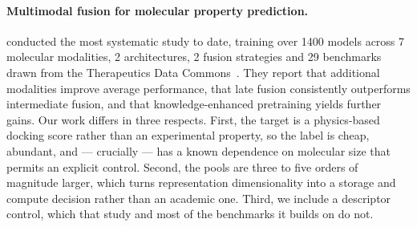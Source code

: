 \paragraph{Multimodal fusion for molecular property prediction.}
\citet{martinezgalindo2026multimodality} conducted the most systematic study to
date, training over \num{1400} models across \num{7} molecular modalities,
\num{2} architectures, \num{2} fusion strategies and \num{29} benchmarks drawn
from the Therapeutics Data Commons~\citep{huang2021tdc}. They report that
additional modalities improve average performance, that late fusion
consistently outperforms intermediate fusion, and that knowledge-enhanced
pretraining yields further gains. Our work differs in three respects. First,
the target is a physics-based docking score rather than an experimental
property, so the label is cheap, abundant, and --- crucially --- has a known
dependence on molecular size that permits an explicit control. Second, the
pools are three to five orders of magnitude larger, which turns representation
dimensionality into a storage and compute decision rather than an academic one.
Third, we include a descriptor control, which that study and most of the
benchmarks it builds on do not.

